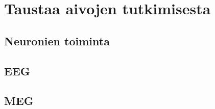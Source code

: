 \section{Taustaa aivojen tutkimisesta}
\subsection{Neuronien toiminta}

\subsection{EEG}


\subsection{MEG}